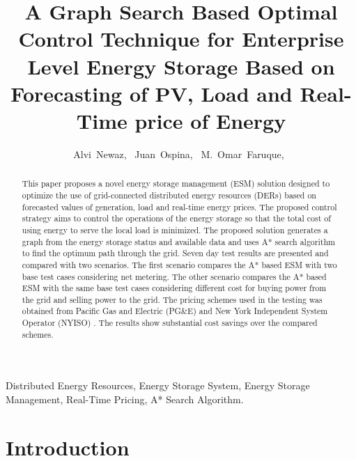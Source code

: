 \documentclass[journal]{IEEEtran}
\begin{document}
\title{A Graph Search Based Optimal Control Technique for Enterprise Level Energy Storage Based on Forecasting of PV, Load and Real-Time price of Energy}

\author{ Alvi~Newaz,~
Juan~Ospina,~
     M.~Omar~Faruque,~
        }%





\maketitle                                                               

\begin{abstract}
This paper proposes a novel energy storage management (ESM) solution designed to optimize the use of grid-connected distributed energy resources (DERs) based on forecasted values of generation, load and real-time energy prices. The proposed control strategy aims to control the operations of the energy storage so that the total cost of using energy to serve the local load is minimized. The proposed solution generates a graph from the energy storage status and available data and uses A* search algorithm to find the optimum path through the grid. Seven day test results are presented and compared with two scenarios. The first scenario compares the A* based ESM with two base test cases considering net metering. The other scenario compares the A* based ESM with the same base test cases considering different cost for buying power from the grid and selling power to the grid. The pricing schemes used in the testing was obtained from Pacific Gas and Electric (PG\&E) \cite{pgne} and New York Independent System Operator (NYISO) \cite{NYISO2017}. The results  show substantial cost savings over the compared schemes.

\end{abstract}


\begin{IEEEkeywords}
Distributed Energy Resources, Energy Storage System, Energy Storage Management, Real-Time Pricing, A* Search Algorithm.
\end{IEEEkeywords}


\IEEEpeerreviewmaketitle



\section{Introduction}

\end{document}
